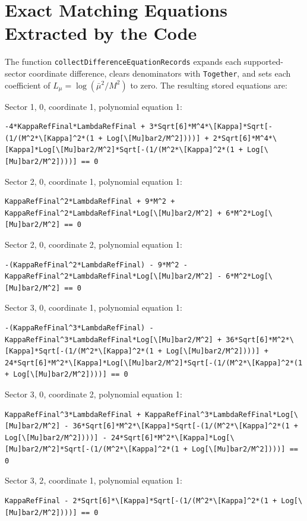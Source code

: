 \documentclass[11pt]{article}
\begin{document}
\section{Exact Matching Equations Extracted by the Code}

The function \texttt{collectDifferenceEquationRecords} expands each supported-sector coordinate difference, clears denominators with \texttt{Together}, and sets each coefficient of $L_\mu = \log(\bar\mu^2/M^2)$ to zero. The resulting stored equations are:

Sector {1, 0}, coordinate 1, polynomial equation 1:
\begin{verbatim}
-4*KappaRefFinal*LambdaRefFinal + 3*Sqrt[6]*M^4*\[Kappa]*Sqrt[-(1/(M^2*\[Kappa]^2*(1 + Log[\[Mu]bar2/M^2])))] + 2*Sqrt[6]*M^4*\[Kappa]*Log[\[Mu]bar2/M^2]*Sqrt[-(1/(M^2*\[Kappa]^2*(1 + Log[\[Mu]bar2/M^2])))] == 0
\end{verbatim}

Sector {2, 0}, coordinate 1, polynomial equation 1:
\begin{verbatim}
KappaRefFinal^2*LambdaRefFinal + 9*M^2 + KappaRefFinal^2*LambdaRefFinal*Log[\[Mu]bar2/M^2] + 6*M^2*Log[\[Mu]bar2/M^2] == 0
\end{verbatim}

Sector {2, 0}, coordinate 2, polynomial equation 1:
\begin{verbatim}
-(KappaRefFinal^2*LambdaRefFinal) - 9*M^2 - KappaRefFinal^2*LambdaRefFinal*Log[\[Mu]bar2/M^2] - 6*M^2*Log[\[Mu]bar2/M^2] == 0
\end{verbatim}

Sector {3, 0}, coordinate 1, polynomial equation 1:
\begin{verbatim}
-(KappaRefFinal^3*LambdaRefFinal) - KappaRefFinal^3*LambdaRefFinal*Log[\[Mu]bar2/M^2] + 36*Sqrt[6]*M^2*\[Kappa]*Sqrt[-(1/(M^2*\[Kappa]^2*(1 + Log[\[Mu]bar2/M^2])))] + 24*Sqrt[6]*M^2*\[Kappa]*Log[\[Mu]bar2/M^2]*Sqrt[-(1/(M^2*\[Kappa]^2*(1 + Log[\[Mu]bar2/M^2])))] == 0
\end{verbatim}

Sector {3, 0}, coordinate 2, polynomial equation 1:
\begin{verbatim}
KappaRefFinal^3*LambdaRefFinal + KappaRefFinal^3*LambdaRefFinal*Log[\[Mu]bar2/M^2] - 36*Sqrt[6]*M^2*\[Kappa]*Sqrt[-(1/(M^2*\[Kappa]^2*(1 + Log[\[Mu]bar2/M^2])))] - 24*Sqrt[6]*M^2*\[Kappa]*Log[\[Mu]bar2/M^2]*Sqrt[-(1/(M^2*\[Kappa]^2*(1 + Log[\[Mu]bar2/M^2])))] == 0
\end{verbatim}

Sector {3, 2}, coordinate 1, polynomial equation 1:
\begin{verbatim}
KappaRefFinal - 2*Sqrt[6]*\[Kappa]*Sqrt[-(1/(M^2*\[Kappa]^2*(1 + Log[\[Mu]bar2/M^2])))] == 0
\end{verbatim}
\end{document}
